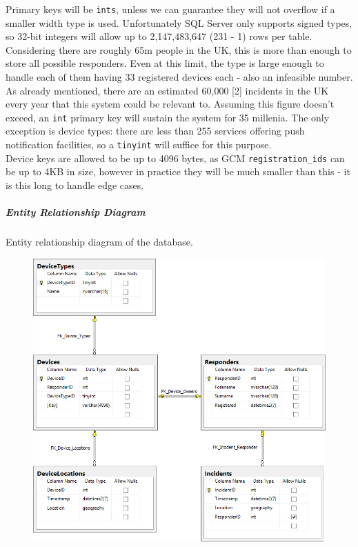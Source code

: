 \documentclass{article}
\begin{document}
	Primary keys will be \texttt{\color{OliveGreen}ints}, unless we can guarantee they will not overflow if a smaller width type is used. Unfortunately SQL Server only supports signed types, so 32-bit integers will allow up to 2,147,483,647 (231 - 1) rows per table. Considering there are roughly 65m people in the UK, this is more than enough to store all possible responders. Even at this limit, the type is large enough to handle each of them having 33 registered devices each - also an infeasible number. As already mentioned, there are an estimated 60,000 [2] incidents in the UK every year that this system could be relevant to. Assuming this figure doesn’t exceed, an \texttt{\color{OliveGreen}int} primary key will sustain the system for 35 millenia. The only exception is device types: there are less than 255 services offering push notification facilities, so a \texttt{\color{OliveGreen}tinyint} will suffice for this purpose.\\

Device keys are allowed to be up to 4096 bytes, as GCM \texttt{\color{OliveGreen}registration\_ids} can be up to 4KB in size, however in practice they will be much smaller than this - it is this long to handle edge cases.\\

\pagebreak
\subparagraph{Entity Relationship Diagram}
Entity relationship diagram of the database.
	\begin{figure}[H]
		\centering
		\includegraphics[width=1\textwidth]{"Iteration1/cpr-database-0"}
	\end{figure}
\end{document}
